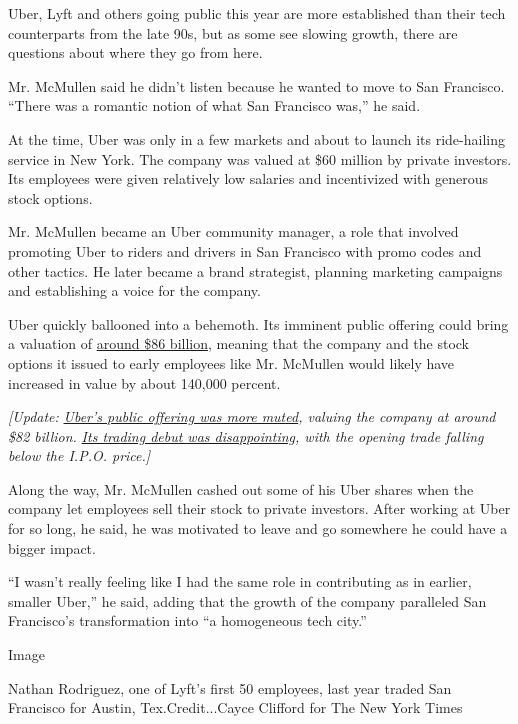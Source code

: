 Uber, Lyft and others going public this year are more established than
their tech counterparts from the late 90s, but as some see slowing
growth, there are questions about where they go from here.

Mr. McMullen said he didn't listen because he wanted to move to San
Francisco. ``There was a romantic notion of what San Francisco was,'' he
said.

At the time, Uber was only in a few markets and about to launch its
ride-hailing service in New York. The company was valued at \$60 million
by private investors. Its employees were given relatively low salaries
and incentivized with generous stock options.

Mr. McMullen became an Uber community manager, a role that involved
promoting Uber to riders and drivers in San Francisco with promo codes
and other tactics. He later became a brand strategist, planning
marketing campaigns and establishing a voice for the company.

Uber quickly ballooned into a behemoth. Its imminent public offering
could bring a valuation of
\href{https://www.nytimes3xbfgragh.onion/2019/05/08/technology/uber-ipo-price.html}{around
\$86 billion}, meaning that the company and the stock options it issued
to early employees like Mr. McMullen would likely have increased in
value by about 140,000 percent.

\emph{{[}Update:}
\href{https://www.nytimes3xbfgragh.onion/2019/05/09/technology/uber-ipo-price.html}{\emph{Uber's
public offering was more muted}}\emph{, valuing the company at around
\$82 billion. \textbar{}}
\href{https://www.nytimes3xbfgragh.onion/2019/05/10/technology/uber-stock-price-ipo.html}{\emph{Its
trading debut was disappointing}}\emph{, with the opening trade falling
below the I.P.O. price.{]}}

Along the way, Mr. McMullen cashed out some of his Uber shares when the
company let employees sell their stock to private investors. After
working at Uber for so long, he said, he was motivated to leave and go
somewhere he could have a bigger impact.

``I wasn't really feeling like I had the same role in contributing as in
earlier, smaller Uber,'' he said, adding that the growth of the company
paralleled San Francisco's transformation into ``a homogeneous tech
city.''

Image

Nathan Rodriguez, one of Lyft's first 50 employees, last year traded San
Francisco for Austin, Tex.Credit...Cayce Clifford for The New York Times

